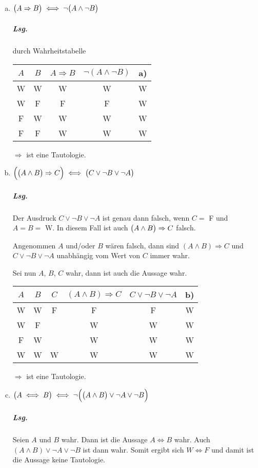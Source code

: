 \documentclass{scrreprt}
\begin{document}
\begin{enumerate}[a)]
\item $\qty\big(A \Rightarrow B) \iff \neg \qty\big(A \land \neg B)$

  \subparagraph{Lsg.} durch Wahrheitstabelle
  \begin{center}
    \begin{tabular}{c | c | c | c | c}
      $A$ & $B$ & $A \Rightarrow B$ & $\neg(A \land \neg B)$ & a) \\
      \hline
      W & W & W & W & W \\
      W & F & F & F & W \\
      F & W & W & W & W \\
      F & F & W & W & W
    \end{tabular}
  \end{center}
  $\Rightarrow$ ist eine Tautologie.

\item $\qty\Big(\qty\big(A \land B) \Rightarrow C) \iff \qty\big(C \lor \neg B \lor \neg A)$

  \subparagraph{Lsg.} Der Ausdruck $C \lor \neg B \lor \neg A$ ist genau dann
  falsch, wenn $C = $ F und $A = B = $ W.
  In diesem Fall ist auch $\qty\big(A \land B) \Rightarrow C$ falsch.

  Angenommen $A$ und/oder $B$ wären falsch, dann sind $(A \land B) \Rightarrow C$
  und $C \lor \neg B \lor \neg A$ unabhängig vom Wert von $C$ immer wahr.

  Sei nun $A$, $B$, $C$ wahr, dann ist auch die Aussage wahr.

  \begin{center}
    \begin{tabular}{c | c | c | c | c | c}
      $A$ & $B$ & $C$ & $(A \land B) \Rightarrow C$ & $C \lor \neg B \lor \neg A$ & b) \\
      \hline
      W & W & F & F & F & W \\
      W & F &   & W & W & W \\
      F & W &   & W & W & W \\
      W & W & W & W & W & W
    \end{tabular}
  \end{center}
  $\Rightarrow$ ist eine Tautologie.

\item $\qty\big(A \iff B) \iff \neg \qty\Big(\qty\big(A \land B) \lor \neg A \lor \neg B)$
  \subparagraph{Lsg.} Seien $A$ und $B$ wahr.
  Dann ist die Aussage $A \iff B$ wahr.
  Auch $(A \land B) \lor \neg A \lor \neg B$ ist dann wahr.
  Somit ergibt sich $W \iff F$ und damit ist die Aussage keine Tautologie.
\end{enumerate}
\end{document}

